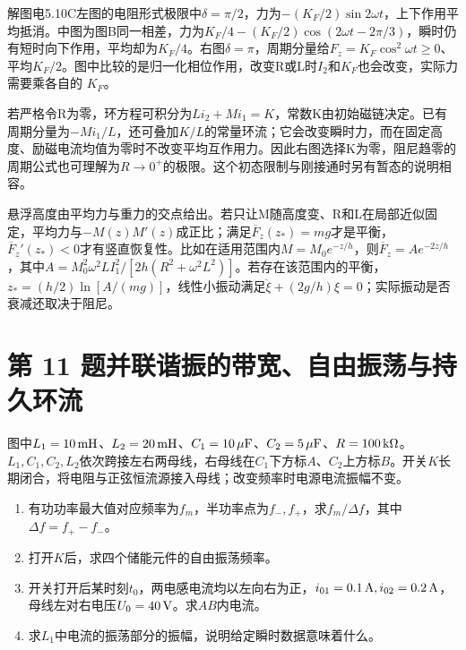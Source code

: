 \documentclass[UTF8,fontset=fandol,a4paper,11pt]{ctexart}
\begin{document}
解图电5.10C左图的电阻形式极限中$\delta=\pi/2$，力为$-(K_F/2)\sin2\omega t$，上下作用平均抵消。中图为图B同一相差，力为$K_F/4-(K_F/2)\cos(2\omega t-2\pi/3)$，瞬时仍有短时向下作用，平均却为$K_F/4$。右图$\delta=\pi$，周期分量给$F_z=K_F\cos^2\omega t\ge0$、平均$K_F/2$。图中比较的是归一化相位作用，改变R或L时$I_2$和$K_F$也会改变，实际力需要乘各自的 $K_F$。

若严格令R为零，环方程可积分为$Li_2+Mi_1=K$，常数K由初始磁链决定。已有周期分量为$-Mi_1/L$，还可叠加$K/L$的常量环流；它会改变瞬时力，而在固定高度、励磁电流均值为零时不改变平均互作用力。因此右图选择K为零，阻尼趋零的周期公式也可理解为$R\to0^+$的极限。这个初态限制与刚接通时另有暂态的说明相容。

悬浮高度由平均力与重力的交点给出。若只让M随高度变、R和L在局部近似固定，平均力与$-M(z)M'(z)$成正比；满足$\overline F_z(z_*)=mg$才是平衡，$\overline F_z'(z_*)<0$才有竖直恢复性。比如在适用范围内$M=M_0e^{-z/h}$，则$\overline F_z=Ae^{-2z/h}$，其中$A=M_0^2\omega^2LI_1^2/[2h(R^2+\omega^2L^2)]$。若存在该范围内的平衡，$z_*=(h/2)\ln[A/(mg)]$，线性小振动满足$\ddot\xi+(2g/h)\xi=0$；实际振动是否衰减还取决于阻尼。




\section*{第 11 题\quad 并联谐振的带宽、自由振荡与持久环流}\label{q:11}


图中$L_1=10\,{\rm mH}$、$L_2=20\,{\rm mH}$、$C_1=10\,\mu{\rm F}$、$C_2=5\,\mu{\rm F}$、$R=100\,{\rm k}\Omega$。$L_1,C_1,C_2,L_2$依次跨接左右两母线，右母线在$C_1$下方标$A$、$C_2$上方标$B$。开关$K$长期闭合，将电阻与正弦恒流源接入母线；改变频率时电源电流振幅不变。
\begin{enumerate}
\item 有功功率最大值对应频率为$f_m$，半功率点为$f_-,f_+$，求$f_m/\Delta f$，其中$\Delta f=f_+-f_-$。
\item 打开$K$后，求四个储能元件的自由振荡频率。
\item 开关打开后某时刻$t_0$，两电感电流均以左向右为正，$i_{01}=0.1\,{\rm A},i_{02}=0.2\,{\rm A}$，母线左对右电压$U_0=40\,{\rm V}$。求$AB$内电流。
\item 求$L_1$中电流的振荡部分的振幅，说明给定瞬时数据意味着什么。
\end{enumerate}
\end{document}
